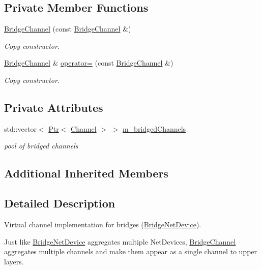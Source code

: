 \subsection*{Private Member Functions}
\begin{DoxyCompactItemize}
\item 
\hyperlink{classns3_1_1BridgeChannel_af465ebedcecfd063a0e3af7b141a59b2}{Bridge\+Channel} (const \hyperlink{classns3_1_1BridgeChannel}{Bridge\+Channel} \&)
\begin{DoxyCompactList}\small\item\em Copy constructor. \end{DoxyCompactList}\item 
\hyperlink{classns3_1_1BridgeChannel}{Bridge\+Channel} \& \hyperlink{classns3_1_1BridgeChannel_a130ad1622b24c84d704b9a17292bd1e8}{operator=} (const \hyperlink{classns3_1_1BridgeChannel}{Bridge\+Channel} \&)
\begin{DoxyCompactList}\small\item\em Copy constructor. \end{DoxyCompactList}\end{DoxyCompactItemize}
\subsection*{Private Attributes}
\begin{DoxyCompactItemize}
\item 
std\+::vector$<$ \hyperlink{classns3_1_1Ptr}{Ptr}$<$ \hyperlink{classns3_1_1Channel}{Channel} $>$ $>$ \hyperlink{classns3_1_1BridgeChannel_a2676f0c161f4b53635ae5a4e2e0d356d}{m\+\_\+bridged\+Channels}
\begin{DoxyCompactList}\small\item\em pool of bridged channels \end{DoxyCompactList}\end{DoxyCompactItemize}
\subsection*{Additional Inherited Members}


\subsection{Detailed Description}
Virtual channel implementation for bridges (\hyperlink{classns3_1_1BridgeNetDevice}{Bridge\+Net\+Device}). 

Just like \hyperlink{classns3_1_1BridgeNetDevice}{Bridge\+Net\+Device} aggregates multiple Net\+Devices, \hyperlink{classns3_1_1BridgeChannel}{Bridge\+Channel} aggregates multiple channels and make them appear as a single channel to upper layers. 

